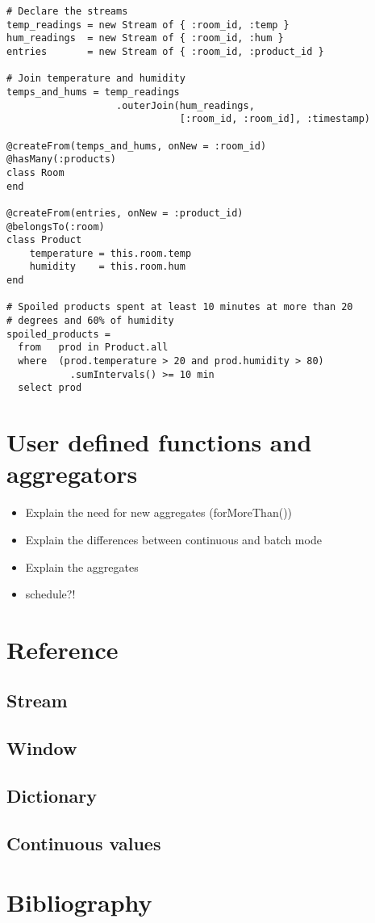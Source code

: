 \documentclass{report}
\begin{document}
\begin{verbatim}
# Declare the streams
temp_readings = new Stream of { :room_id, :temp }
hum_readings  = new Stream of { :room_id, :hum }
entries       = new Stream of { :room_id, :product_id }

# Join temperature and humidity
temps_and_hums = temp_readings
                   .outerJoin(hum_readings,
                              [:room_id, :room_id], :timestamp)

@createFrom(temps_and_hums, onNew = :room_id)
@hasMany(:products)
class Room
end

@createFrom(entries, onNew = :product_id)
@belongsTo(:room)
class Product
    temperature = this.room.temp
    humidity    = this.room.hum
end

# Spoiled products spent at least 10 minutes at more than 20
# degrees and 60% of humidity
spoiled_products =
  from   prod in Product.all
  where  (prod.temperature > 20 and prod.humidity > 80)
           .sumIntervals() >= 10 min
  select prod
\end{verbatim}

\chapter{User defined functions and aggregators}
\label{chap:udfs}

\begin{itemize}
\item Explain the need for new aggregates (forMoreThan())
\item Explain the differences between continuous and batch mode
\item Explain the aggregates
\item schedule?!
\end{itemize}
\chapter{Reference}

\section{Stream}

\section{Window}

\section{Dictionary}

\section{Continuous values}

\chapter{Bibliography}
\end{document}
